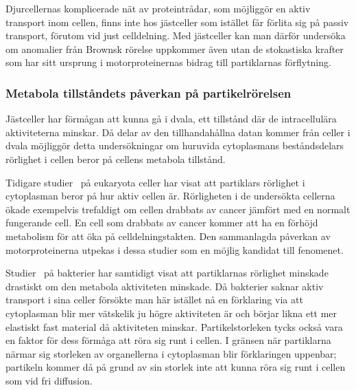 Djurcellernas komplicerade nät av proteintrådar, som möjliggör en aktiv
transport inom cellen, finns inte hos jästceller som istället får
förlita sig på passiv transport, förutom vid just
celldelning.  
Med jästceller kan man därför undersöka om anomalier från Brownsk
rörelse uppkommer även utan de 
stokastiska krafter som har sitt ursprung i motorproteinernas bidrag
till partiklarnas förflytning.


\subsubsection{Metabola tillståndets påverkan på partikelrörelsen}
Jästceller har förmågan att kunna gå i dvala, ett tillstånd där de
intracellulära aktiviteterna minskar. Då delar av den tillhandahållna
datan kommer från celler i dvala möjliggör detta undersökningar om
huruvida cytoplasmans beståndsdelars rörlighet i cellen beror på
cellens metabola tillstånd. 

Tidigare studier~\cite{Gou_etal2014} på eukaryota celler har visat att
partiklars rörlighet i cytoplasman beror på hur aktiv cellen
är. Rörligheten i de undersökta cellerna ökade exempelvis
trefaldigt om cellen drabbats av cancer jämfört med en normalt
fungerande cell. En cell som drabbats av cancer kommer att ha en
förhöjd metabolism för att öka på celldelningstakten. Den sammanlagda
påverkan av motorproteinerna utpekas i dessa studier
som en möjlig kandidat till fenomenet. 

Studier~\cite{Parry_etal2014} på bakterier har samtidigt visat att
partiklarnas rörlighet minskade drastiskt om den metabola aktiviteten
minskade. Då bakterier saknar aktiv transport i sina celler försökte
 man här istället nå en förklaring via att
cytoplasman blir mer vätskelik ju högre aktiviteten är och börjar
likna ett mer elastiskt fast material då aktiviteten
minskar. Partikelstorleken tycks också vara en faktor för dess förmåga
att röra sig runt i cellen. I gränsen när partiklarna närmar sig
storleken av organellerna i cytoplasman blir förklaringen uppenbar;
partikeln kommer då på grund av sin storlek inte att kunna röra sig
runt i cellen som vid fri diffusion. 


